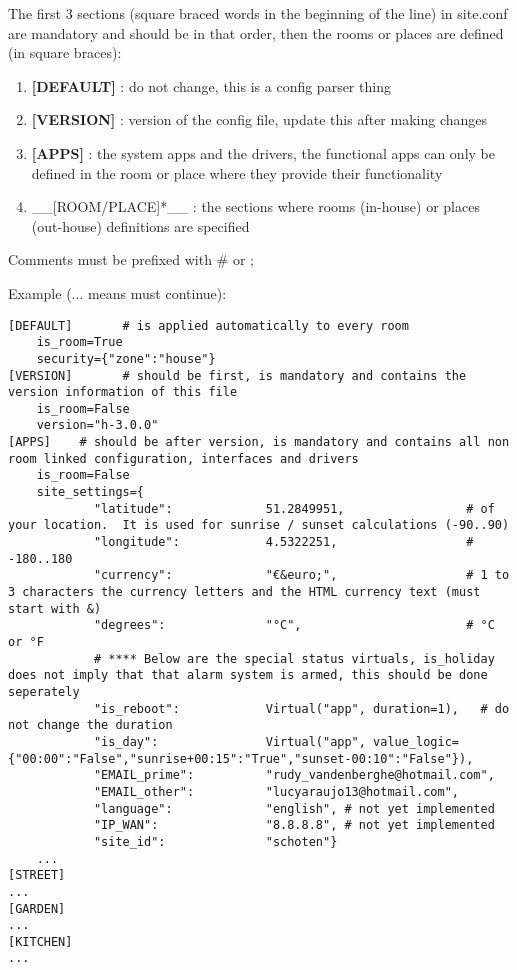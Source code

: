 The first 3 sections (square braced words in the beginning of the line)
in site.conf are mandatory and should be in that order, then the rooms
or places are defined (in square braces):

\begin{enumerate}
\def\labelenumi{\arabic{enumi}.}
\item
  \textbf{{[}DEFAULT{]}} : do not change, this is a config parser thing
\item
  \textbf{{[}VERSION{]}} : version of the config file, update this after
  making changes
\item
  \textbf{{[}APPS{]}} : the system apps and the drivers, the functional
  apps can only be defined in the room or place where they provide their
  functionality
\item
  \_\_{[}ROOM/PLACE{]}*\_\_ : the sections where rooms (in-house) or
  places (out-house) definitions are specified
\end{enumerate}

Comments must be prefixed with \# or ;

Example (... means must continue):

\begin{verbatim}
[DEFAULT]       # is applied automatically to every room
    is_room=True
    security={"zone":"house"}
[VERSION]       # should be first, is mandatory and contains the version information of this file
    is_room=False
    version="h-3.0.0"
[APPS]    # should be after version, is mandatory and contains all non room linked configuration, interfaces and drivers
    is_room=False
    site_settings={           
            "latitude":             51.2849951,                 # of your location.  It is used for sunrise / sunset calculations (-90..90)
            "longitude":            4.5322251,                  # -180..180
            "currency":             "€&euro;",                  # 1 to 3 characters the currency letters and the HTML currency text (must start with &)
            "degrees":              "°C",                       # °C or °F
            # **** Below are the special status virtuals, is_holiday does not imply that that alarm system is armed, this should be done seperately
            "is_reboot":            Virtual("app", duration=1),   # do not change the duration
            "is_day":               Virtual("app", value_logic={"00:00":"False","sunrise+00:15":"True","sunset-00:10":"False"}),
            "EMAIL_prime":          "rudy_vandenberghe@hotmail.com",
            "EMAIL_other":          "lucyaraujo13@hotmail.com",
            "language":             "english", # not yet implemented
            "IP_WAN":               "8.8.8.8", # not yet implemented
            "site_id":              "schoten"}
    ...
[STREET]
...
[GARDEN]
...
[KITCHEN]
...
\end{verbatim}

